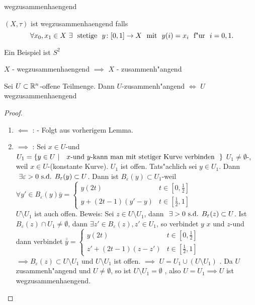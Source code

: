 \documentclass[class=article, crop=false]{standalone}
\begin{document}
\begin{zettel}{wegzusammenhaengend}
\begin{flashcard}
    \begin{definition}
    $(X,\tau)$ ist wegzusammenhaengend falls 
\[
    \forall x_0,x_1 \in  X \exists \tx{ stetige } y \from [0,1] \to X \tx{ mit } y(i)=  x_i \tx{ f"ur } i =  0,1
.\]
    \end{definition}
\end{flashcard}
    \begin{example}
    Ein Beispiel ist $S^2$ 
    \end{example}
    \begin{lemma}
    $X$ - wegzusammenhaengend $\implies $ $X$ - zusammenh"angend
    \end{lemma}
    \begin{lemma}
   Sei $U \subset \mathbb{R}^n$-offene Teilmenge. Dann $U$-zusammenh"angend $\iff $ $U$ wegzusammenhaengend
    \end{lemma}
    \begin{proof}
        \begin{enumerate}
            \item $\impliedby $ : - Folgt aus vorherigem Lemma.
            \item $\implies $ : Sei $x \in  U$-und $U_1 =\set{y \in  U}{\tx{ $x$-und $y$-kann man mit stetiger Kurve verbinden } }$ $U_1 \neq \emptyset $-, weil $x \in  U$-(konstante Kurve). $U_1$ ist offen. Tats"achlich sei $y \in  U_1$. Dann $\exists \varepsilon > 0 \tx{s.d.} B_{\varepsilon}(y) \subset  U$. Dann ist $B_{\varepsilon}(y) \subset  U_1$-weil $\forall y' \in  B_{\varepsilon}(y) \bar{y} = \begin{cases}
                    y (2t) & t \in  [0,\frac{1}{2}]\\
                    y + (2t-1)(y'-y) & t \in  [\frac{1}{2},1]
            \end{cases}$\\

            $U \setminus U_1$ ist auch offen. Beweis: Sei $z \in  U \setminus  U_1 $, dann $\exists >0 \tx{s.d.} B_{\varepsilon}(z) \subset  U$. Ist $B_{\varepsilon}(z) \cap  U_1 \neq  \emptyset $, dann $\exists  z' \in  B_{\varepsilon}(z), z' \in  U_1$, so verbindet $y$ $x$ und $z$-und dann verbindet $\bar{\bar{y}} = \begin{cases}
                y(2t) & t \in [0,\frac{1}{2}]\\
                z'+(2t-1)(z-z') & t \in  [\frac{1}{2}, 1]
            \end{cases}$\\
        
            $\implies B_{\varepsilon}(z) \subset U \setminus U_1$ und $U \setminus U_1$ ist offen. $\implies $ $U = U_1 \cup (U \setminus  U_1)$ . Da $U$ zusammenh"angend und $U \neq  \emptyset $, so ist $U \setminus U_1 = \emptyset $ , also $U = U_1 \implies U$ ist wegzusammenhaengend.

        \end{enumerate}
    \end{proof}
\end{zettel}
\end{document}
